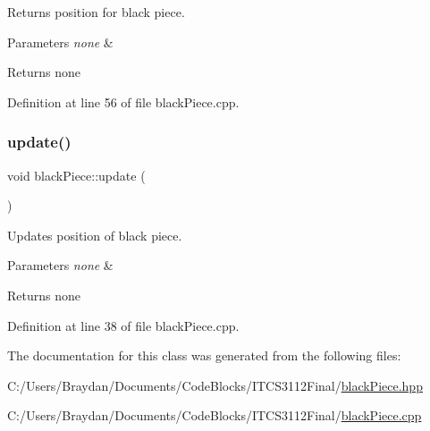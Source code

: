 Returns position for black piece.


\begin{DoxyParams}{Parameters}
{\em none} & \\
\hline
\end{DoxyParams}
\begin{DoxyReturn}{Returns}
none 
\end{DoxyReturn}


Definition at line 56 of file black\+Piece.\+cpp.

\mbox{\label{classblack_piece_a8ab322b89affd828b413b3fee35827fa}} 
\subsubsection{\texorpdfstring{update()}{update()}}
{\footnotesize\ttfamily void black\+Piece\+::update (\begin{DoxyParamCaption}{ }\end{DoxyParamCaption})}

Updates position of black piece.


\begin{DoxyParams}{Parameters}
{\em none} & \\
\hline
\end{DoxyParams}
\begin{DoxyReturn}{Returns}
none 
\end{DoxyReturn}


Definition at line 38 of file black\+Piece.\+cpp.



The documentation for this class was generated from the following files\+:\begin{DoxyCompactItemize}
\item 
C\+:/\+Users/\+Braydan/\+Documents/\+Code\+Blocks/\+I\+T\+C\+S3112\+Final/\mbox{\hyperlink{black_piece_8hpp}{black\+Piece.\+hpp}}\item 
C\+:/\+Users/\+Braydan/\+Documents/\+Code\+Blocks/\+I\+T\+C\+S3112\+Final/\mbox{\hyperlink{black_piece_8cpp}{black\+Piece.\+cpp}}\end{DoxyCompactItemize}

